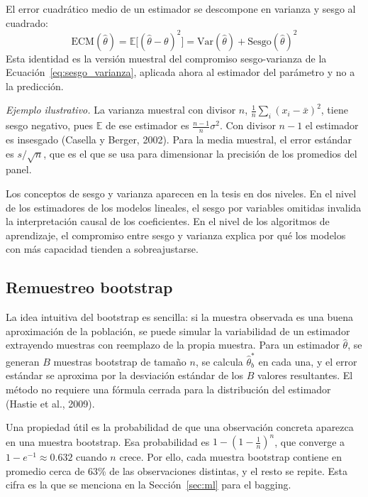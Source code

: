 El error cuadrático medio de un estimador se descompone en varianza y sesgo al cuadrado:
\begin{equation}
\text{ECM}(\hat{\theta})=\mathbb{E}\big[(\hat{\theta}-\theta)^2\big]=\text{Var}(\hat{\theta})+\text{Sesgo}(\hat{\theta})^2
\label{eq:ecm_estimador}
\end{equation}
Esta identidad es la versión muestral del compromiso sesgo-varianza de la Ecuación~\eqref{eq:sesgo_varianza}, aplicada ahora al estimador del parámetro y no a la predicción.

\textit{Ejemplo ilustrativo.} La varianza muestral con divisor $n$, $\frac{1}{n}\sum_i(x_i-\bar{x})^2$, tiene sesgo negativo, pues $\mathbb{E}$ de ese estimador es $\frac{n-1}{n}\sigma^2$. Con divisor $n-1$ el estimador es insesgado (Casella y Berger, 2002). Para la media muestral, el error estándar es $s/\sqrt{n}$, que es el que se usa para dimensionar la precisión de los promedios del panel.

Los conceptos de sesgo y varianza aparecen en la tesis en dos niveles. En el nivel de los estimadores de los modelos lineales, el sesgo por variables omitidas invalida la interpretación causal de los coeficientes. En el nivel de los algoritmos de aprendizaje, el compromiso entre sesgo y varianza explica por qué los modelos con más capacidad tienden a sobreajustarse.

\subsection{Remuestreo bootstrap}
La idea intuitiva del bootstrap es sencilla: si la muestra observada es una buena aproximación de la población, se puede simular la variabilidad de un estimador extrayendo muestras con reemplazo de la propia muestra. Para un estimador $\hat{\theta}$, se generan $B$ muestras bootstrap de tamaño $n$, se calcula $\hat{\theta}^{*}_b$ en cada una, y el error estándar se aproxima por la desviación estándar de los $B$ valores resultantes. El método no requiere una fórmula cerrada para la distribución del estimador (Hastie et al., 2009).

Una propiedad útil es la probabilidad de que una observación concreta aparezca en una muestra bootstrap. Esa probabilidad es $1-(1-\tfrac{1}{n})^n$, que converge a $1-e^{-1}\approx 0.632$ cuando $n$ crece. Por ello, cada muestra bootstrap contiene en promedio cerca de 63\% de las observaciones distintas, y el resto se repite. Esta cifra es la que se menciona en la Sección~\ref{sec:ml} para el bagging.

